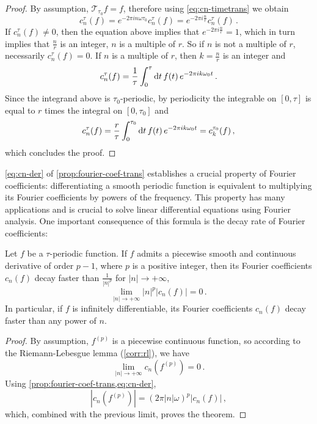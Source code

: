 \begin{proof}
  By assumption, $\mathcal{T}_{\tau_0}f=f$, therefore using \cref{eq:cn-timetrans} we
  obtain
  \begin{equation}
    c_n^\tau(f)=e^{-2\pi i n\omega \tau_0}c_n^\tau(f)=e^{-2\pi i \frac{n}{r}}c_n^\tau(f)\,.
  \end{equation}
  If $c_n^\tau(f)\neq 0$, then the equation above implies that $e^{-2\pi i
  \frac{n}{r}}=1$, which in turn implies that $\frac{n}{r}$ is an integer, \ie $n$ is a
  multiple of $r$. So if $n$ is not a multiple of $r$, necessarily $c_n^\tau(f)=0$. If $n$
  is a multiple of $r$, then $k=\frac{n}{r}$ is an integer and
  \begin{equation}
    c_n^\tau(f)=\frac{1}{\tau}\int_{0}^{\tau}\mathrm{d} t\,f(t)\,e^{-2\pi i k\omega_0 t}\,.
  \end{equation}
  Since the integrand above is $\tau_0$-periodic, by periodicity the integrable on
  $[0,\tau]$ is equal to $r$ times the integral on $[0,\tau_0]$ and
  \begin{equation}
    c_n^\tau(f)=\frac{r}{\tau}\int_{0}^{\tau_0}\mathrm{d} t\,f(t)\,
    e^{-2\pi i k\omega_0 t}=c_{k}^{\tau_0}(f)\,,
  \end{equation}
  which concludes the proof.
\end{proof}
\cref{eq:cn-der} of \cref{prop:fourier-coef-trans} establishes a crucial property of Fourier
coefficients: differentiating a smooth periodic function is equivalent to multiplying its
Fourier coefficients by powers of the frequency. This property has many applications and
is crucial to solve linear differential equations using Fourier analysis. One important
consequence of this formula is the decay rate of Fourier coefficients:
\begin{theorem}
  \label{thm:fourier-series-decay}
  Let $f$ be a $\tau$-periodic function. If $f$ admits a piecewise smooth and continuous
  derivative of order $p-1$, where $p$ is a positive integer, then its Fourier
  coefficients $c_n(f)$ decay faster than $\frac{1}{|n|^p}$ for $|n|\to+\infty$, \ie
  \begin{equation}
    \lim_{|n|\to+\infty} |n|^p|c_n(f)|=0\,.
  \end{equation}
  In particular, if $f$ is infinitely differentiable, its Fourier coefficients $c_n(f)$
  decay faster than any power of $n$.
\end{theorem}
\begin{proof}
  By assumption, $f^{(p)}$ is a piecewise continuous function, so according to the
  Riemann-Lebesgue lemma (\cref{corr:rl}), we have
  \begin{equation}
    \lim_{|n|\to+\infty} c_n(f^{(p)})=0\,.
  \end{equation}
  Using \cref{prop:fourier-coef-trans,eq:cn-der},
  \begin{equation}
    |c_n(f^{(p)})|=(2\pi |n|\omega)^p|c_n(f)|\,,
  \end{equation}
  which, combined with the previous limit, proves the theorem.
\end{proof}
